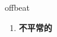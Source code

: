 
\begin{frame}
{\huge offbeat}
\begin{center}
\begin{enumerate}\Large
  \item \textbf{不平常的}
\end{enumerate}
\end{center}
\end{frame}
